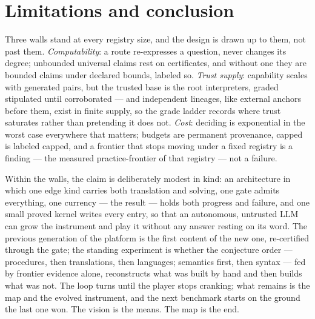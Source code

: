 
\section{Limitations and conclusion}
\label{sec:conclusion}

Three walls stand at every registry size, and the design is drawn up
to them, not past them. \emph{Computability}: a route re-expresses a
question, never changes its degree; unbounded universal claims rest
on certificates, and without one they are bounded claims under
declared bounds, labeled so. \emph{Trust supply}: capability scales
with generated pairs, but the trusted base is the root interpreters,
graded stipulated until corroborated --- and independent lineages,
like external anchors before them, exist in finite supply, so the
grade ladder records where trust saturates rather than pretending it
does not. \emph{Cost}: deciding is exponential in the worst case
everywhere that matters; budgets are permanent provenance, capped is
labeled capped, and a frontier that stops moving under a fixed
registry is a finding --- the measured practice-frontier of that
registry --- not a failure.

Within the walls, the claim is deliberately modest in kind: an
architecture in which one edge kind carries both translation and
solving, one gate admits everything, one currency --- the result ---
holds both progress and failure, and one small proved kernel writes
every entry, so that an autonomous, untrusted LLM can grow the
instrument and play it without any answer resting on its word. The
previous generation of the platform is the first content of the new
one, re-certified through the gate; the standing experiment is
whether the conjecture order --- procedures, then translations, then
languages; semantics first, then syntax --- fed by frontier evidence
alone, reconstructs what was built by hand and then builds what was
not. The loop turns until the player stops cranking; what remains is
the map and the evolved instrument, and the next benchmark starts on
the ground the last one won. The vision is the means. The map is the
end.
